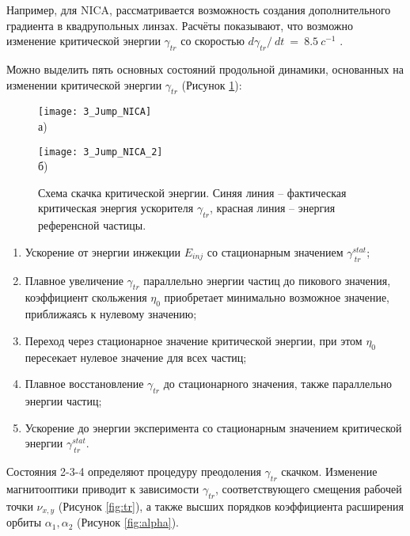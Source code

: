 Например, для NICA, рассматривается возможность создания дополнительного градиента в квадрупольных линзах. Расчёты показывают, что возможно изменение критической энергии $\gamma_{tr}$ со скоростью $d\gamma_{tr}/\ dt\ =\ 8.5\ c^{-1}$ \cite{syresin}.

Можно выделить пять основных состояний продольной динамики, основанных на изменении критической энергии 
$\gamma_{tr}$ (Рисунок \ref{fig:jump_NICA}):

\begin{figure}[ht]
    \begin{minipage}[b][][b]{0.49\linewidth}\centering
        \texttt{[image: 3\_Jump\_NICA]} \\ а)
    \end{minipage}
    \hfill
    \begin{minipage}[b][][b]{0.49\linewidth}\centering
        \texttt{[image: 3\_Jump\_NICA\_2]} \\ б)
    \end{minipage}
    \caption{Схема скачка критической энергии. Синяя линия – фактическая критическая энергия ускорителя $\gamma_{tr}$, красная линия – энергия референсной частицы.}
    \label{fig:jump_NICA}
\end{figure}

\begin{enumerate} 
  \item Ускорение от энергии инжекции $E_{inj}$ со стационарным значением $\gamma_{\ tr}^{stat}$;
  \item  Плавное увеличение $\gamma_{tr}$ параллельно энергии частиц до пикового значения, коэффициент скольжения $\eta_0$ приобретает минимально возможное значение, приближаясь к нулевому значению;
  \item Переход через стационарное значение критической энергии, при этом $\eta_0$ пересекает нулевое значение для всех частиц;
  \item Плавное восстановление $\gamma_{tr}$ до стационарного значения, также па\-рал\-лель\-но энергии частиц;
  \item Ускорение до энергии эксперимента со стационарным значением критической энергии $\gamma_{\ tr}^{stat}$.
  \end{enumerate}
 
Состояния 2-3-4 определяют процедуру преодоления $\gamma_{tr}$ скачком. Из\-ме\-не\-ние магнитооптики приводит к зависимости $\gamma_{tr}$, соответствующего смещения рабочей точки $\nu_{x,y}$ (Рисунок \ref{fig:tr}), а также высших порядков коэффициента расширения орбиты $\alpha_1, \alpha_2$ (Рисунок \ref{fig:alpha}).

